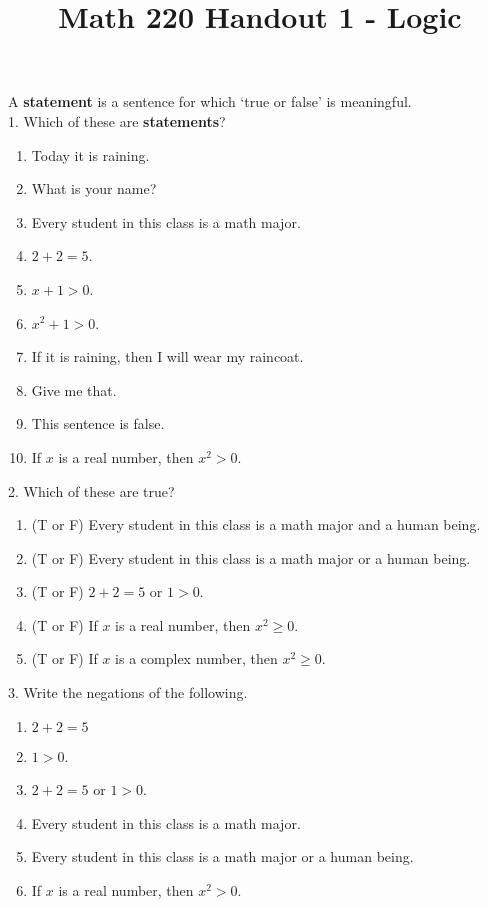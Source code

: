 \documentclass[12pt, reqno]{amsart}
\begin{document}
\title[Math 220 Handout 1 - Logic]{Math 220 Handout 1 - Logic}\maketitle


A \textbf{statement} is a sentence for which `true or false' is meaningful.
\\

1. Which of these are \textbf{statements}? 
\vspace{10pt}
\begin{enumerate}
\item Today it is raining.
\item What is your name?
\item Every student in this class is a math major.
\item $2 + 2 = 5$.
\item $x + 1  > 0$.
\item $x^2 + 1  > 0$.
\item If it is raining, then I will wear my raincoat.
\item Give me that.
\item This sentence is false.
\item If $x$ is a real number, then $x^2 > 0$.
\end{enumerate}
\vspace{20pt}

2. Which of these are true? 
\vspace{10pt}
\begin{enumerate}
\item (T or F) Every student in this class is a math major and a human being.
\item (T or F) Every student in this class is a math major or a human being.
\item (T or F) $2 + 2 = 5$ or  $1  > 0$.
\item (T or F) If $x$ is a real number, then $x^2 \geq 0$.
\item (T or F) If $x$ is a complex number, then $x^2 \geq 0$.
\end{enumerate}
\vspace{20pt}

3. Write the negations of the following.
\vspace{10pt}
\begin{enumerate}
\item $2 + 2 = 5$
\item $1  > 0$.
\item $2 + 2 = 5$ or  $1  > 0$.
\item Every student in this class is a math major.
\item Every student in this class is a math major or a human being.
\item If $x$ is a real number, then $x^2 > 0$.
\end{enumerate}
\vspace{20pt}
\end{document}

